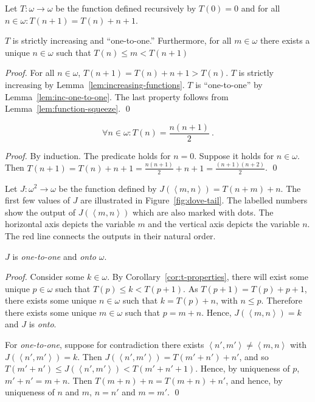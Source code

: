 \documentclass[11pt]{llncs}
\begin{document}
Let $T: \omega \longrightarrow \omega$ be the function defined recursively
by $T(0) = 0$ and for all $n \in \omega: T(n + 1) = T(n) + n + 1$.

\begin{corollary}\label{cor:t-properties}
  $T$ is strictly increasing and ``one-to-one.'' Furthermore, for all
  $m \in \omega$ there exists a unique $n \in \omega$ such that
  $T(n) \leq m < T(n + 1)$
\end{corollary}
\begin{proof}
  For all $n \in \omega$, $T(n + 1) = T(n) + n + 1 > T(n)$. $T$ is strictly
  increasing by Lemma~\ref{lem:increasing-functions}. $T$ is ``one-to-one''
  by Lemma~\ref{lem:inc-one-to-one}. The last property follows from
  Lemma~\ref{lem:function-squeeze}.
  \qed
\end{proof}

\begin{lemma}
  \[\forall n \in \omega: T(n) = \frac{n(n + 1)}{2}~.\]
\end{lemma}
\begin{proof}
  By induction. The predicate holds for $n = 0$.
  Suppose it holds for $n \in \omega$. Then
  $T(n + 1) = T(n) + n + 1 = \frac{n(n + 1)}{2} + n + 1 = \frac{(n + 1)(n + 2)}{2}$.
  \qed
\end{proof}

Let $J: \omega^2 \longrightarrow \omega$ be the function defined by
$J(\left<m, n\right>) = T(n + m) + n$. The first few values of $J$ are
illustrated in Figure~\ref{fig:dove-tail}. The labelled numbers show the output
of $J(\left<m, n\right>)$ which are also marked with dots. The horizontal axis
depicts the variable $m$ and the vertical axis depicts the variable $n$. The red
line connects the outputs in their natural order.

\begin{lemma}
  $J$ is \emph{one-to-one} and \emph{onto} $\omega$.
\end{lemma}
\begin{proof}
  Consider some $k \in \omega$. By Corollary~\ref{cor:t-properties}, there will
  exist some unique $p \in \omega$ such that $T(p) \leq k < T(p + 1)$. As $T(p +
  1) = T(p) + p + 1$, there exists some unique $n \in \omega$ such that $k =
  T(p) + n$, with $n \leq p$. Therefore there exists some unique $m \in \omega$ such
  that $p = m + n$. Hence, $J(\left<m, n\right>) = k$ and $J$ is \emph{onto}.

  For \emph{one-to-one}, suppose for contradiction there exists
  $\left<n', m'\right> \neq \left<m, n\right>$ with
  $J(\left<n', m'\right>) = k$. Then $J(\left<n', m'\right>) = T(m' + n') + n'$,
  and so $T(m' + n') \leq J(\left<n', m'\right>) < T(m' + n' + 1)$.
  Hence, by uniqueness of $p$, $m' + n' = m + n$. Then $T(m + n) + n = T(m + n)
  + n'$, and hence, by uniqueness of $n$ and $m$, $n = n'$ and $m = m'$.
  \qed
\end{proof}
\end{document}
